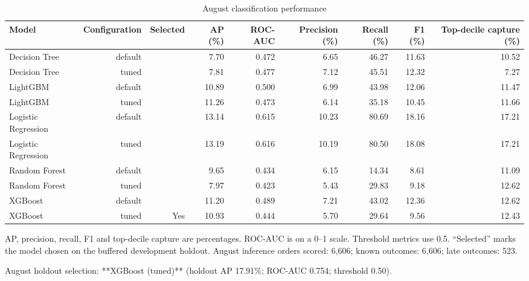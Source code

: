 \begin{table}[htbp]
\centering
\small
\caption{August classification performance}
\begin{tabular}{lrrrrrrrr}
\toprule
Model & Configuration & Selected & AP (\%) & ROC-AUC & Precision (\%) & Recall (\%) & F1 (\%) & Top-decile capture (\%) \\
\midrule
Decision Tree & default &  & 7.70 & 0.472 & 6.65 & 46.27 & 11.63 & 10.52 \\
Decision Tree & tuned &  & 7.81 & 0.477 & 7.12 & 45.51 & 12.32 & 7.27 \\
LightGBM & default &  & 10.89 & 0.500 & 6.99 & 43.98 & 12.06 & 11.47 \\
LightGBM & tuned &  & 11.26 & 0.473 & 6.14 & 35.18 & 10.45 & 11.66 \\
Logistic Regression & default &  & 13.14 & 0.615 & 10.23 & 80.69 & 18.16 & 17.21 \\
Logistic Regression & tuned &  & 13.19 & 0.616 & 10.19 & 80.50 & 18.08 & 17.21 \\
Random Forest & default &  & 9.65 & 0.434 & 6.15 & 14.34 & 8.61 & 11.09 \\
Random Forest & tuned &  & 7.97 & 0.423 & 5.43 & 29.83 & 9.18 & 12.62 \\
XGBoost & default &  & 11.20 & 0.489 & 7.21 & 43.02 & 12.36 & 12.62 \\
XGBoost & tuned & Yes & 10.93 & 0.444 & 5.70 & 29.64 & 9.56 & 12.43 \\
\bottomrule
\end{tabular}
\par\smallskip\begin{minipage}{\linewidth}\footnotesize AP, precision, recall, F1 and top-decile capture are percentages. ROC-AUC is on a 0–1 scale. Threshold metrics use 0.5. “Selected” marks the model chosen on the buffered development holdout. August inference orders scored: 6,606; known outcomes: 6,606; late outcomes: 523.\end{minipage}
\end{table}
August holdout selection: **XGBoost (tuned)** (holdout AP 17.91\%; ROC-AUC 0.754; threshold 0.50).

